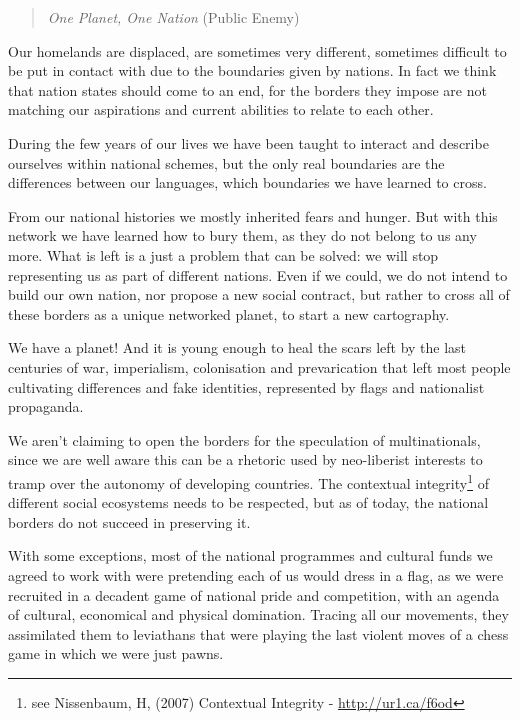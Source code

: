 \begin{quote}
\textit{One Planet, One Nation} (Public Enemy)
\end{quote}

Our homelands are displaced, are sometimes very dif\hbox{}ferent, sometimes
dif\hbox{}f\hbox{}icult to be put in contact with due to the boundaries given by
nations. In fact we think that nation states should come to an end, for the
borders they impose are not matching our aspirations and current abilities to
relate to each other.

During the few years of our lives we have been taught to interact and describe
ourselves within national schemes, but the only real boundaries are the
dif\hbox{}ferences between our languages, which boundaries we have learned to
cross.

From our national histories we mostly inherited fears and hunger. But with this
network we have learned how to bury them, as they do not belong to us any more.
What is left is a just a problem that can be solved: we will stop representing
us as part of dif\hbox{}ferent nations. Even if we could, we do not intend to
build our own nation, nor propose a new social contract, but rather to cross all
of these borders as a unique networked planet, to start a new cartography.

We have a planet! And it is young enough to heal the scars left by the last
centuries of war, imperialism, colonisation and prevarication that left most
people cultivating dif\hbox{}ferences and fake identities, represented by
f\hbox{}lags and nationalist propaganda.

We aren't claiming to open the borders for the speculation of multinationals,
since we are well aware this can be a rhetoric used by neo-liberist interests to
tramp over the autonomy of developing countries. The contextual
integrity\footnote{see Nissenbaum, H, (2007) Contextual Integrity -
\url{http://ur1.ca/f6od}} of dif\hbox{}ferent social ecosystems needs to be
respected, but as of today, the national borders do not succeed in preserving
it.

With some exceptions, most of the national programmes and cultural funds we
agreed to work with were pretending each of us would dress in a f\hbox{}lag, as
we were recruited in a decadent game of national pride and competition, with an
agenda of cultural, economical and physical domination. Tracing all our
movements, they assimilated them to leviathans that were playing the last
violent moves of a chess game in which we were just pawns.

